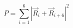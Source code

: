 \documentclass[12pt]{article}
\begin{document}
$$
   P = \sum_{i = 1}^{6} | \vec{R}_i + \vec{R}_{i+6} |^2
$$
\end{document}
